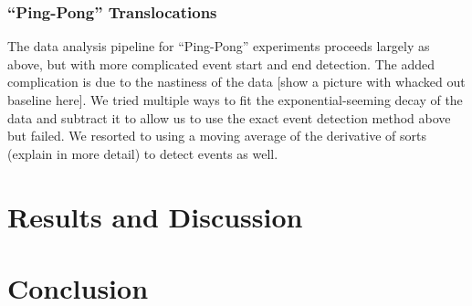 \documentclass[aps,prl,preprint,groupedaddress]{revtex4}
\begin{document}
\subsubsection{``Ping-Pong'' Translocations}

The data analysis pipeline for ``Ping-Pong'' experiments proceeds largely as above, but with more complicated event start and end detection.
The added complication is due to the nastiness of the data [show a picture with whacked out baseline here].
We tried multiple ways to fit the exponential-seeming decay of the data and subtract it to allow us to use the exact event detection method above but failed.
We resorted to using a moving average of the derivative of sorts (explain in more detail) to detect events as well.

\section{Results and Discussion}



\section{Conclusion}



%


\end{document}
